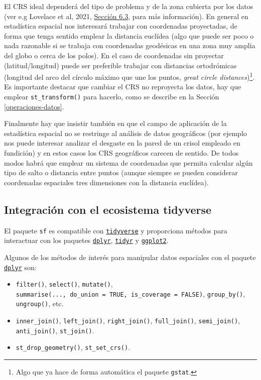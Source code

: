 \documentclass[
  spanish,
]{book}
\providecommand{\tightlist}{%
  \setlength{\itemsep}{0pt}\setlength{\parskip}{0pt}}
\theoremstyle{break}
\begin{document}
El CRS ideal dependerá del tipo de problema y de la zona cubierta por los datos (ver e.g Lovelace et al, 2021, \href{https://geocompr.robinlovelace.net/reproj-geo-data.html\#which-crs-to-use}{Sección 6.3}, para más información).
En general en estadística espacial nos interesará trabajar con coordenadas proyectadas, de forma que tenga sentido emplear la distancia euclídea (algo que puede ser poco o nada razonable si se trabaja con coordenadas geodésicas en una zona muy amplia del globo o cerca de los polos).
En el caso de coordenadas sin proyectar (latitud/longitud) puede ser preferible trabajar con distancias ortodrómicas (longitud del arco del círculo máximo que une los puntos, \emph{great circle distances})\footnote{Algo que ya hace de forma automática el paquete \texttt{gstat}.}.
Es importante destacar que cambiar el CRS no reproyecta los datos, hay que emplear \texttt{st\_transform()} para hacerlo, como se describe en la Sección \ref{operaciones-datos}.

Finalmente hay que insistir también en que el campo de aplicación de la estadística espacial no se restringe al análisis de datos geográficos (por ejemplo nos puede interesar analizar el desgaste en la pared de un crisol empleado en fundición) y en estos casos los CRS geográficos carecen de sentido.
De todos modos habrá que emplear un sistema de coordenadas que permita calcular algún tipo de salto o distancia entre puntos (aunque siempre se pueden considerar coordenadas espaciales tres dimensiones con la distancia euclídea).

\hypertarget{tidyverse-sf}{%
\subsection{\texorpdfstring{Integración con el ecosistema \textbf{tidyverse}}{Integración con el ecosistema tidyverse}}\label{tidyverse-sf}}

El paquete \texttt{sf} es compatible con \href{http://tidyverse.org}{\texttt{tidyverse}} y proporciona métodos para interactuar con los paquetes \href{https://dplyr.tidyverse.org}{\texttt{dplyr}},
\href{http://tidyr.tidyverse.org}{\texttt{tidyr}} y \href{https://ggplot2.tidyverse.org}{\texttt{ggplot2}}.

Algunos de los métodos de interés para manipular datos espaciales con el paquete \href{https://dplyr.tidyverse.org}{\texttt{dplyr}} son:

\begin{itemize}
\tightlist
\item
  \texttt{filter()}, \texttt{select()}, \texttt{mutate()}, \texttt{summarise(...,\ do\_union\ =\ TRUE,\ is\_coverage\ =\ FALSE)}, \texttt{group\_by()}, \texttt{ungroup()}, etc.
\item
  \texttt{inner\_join()}, \texttt{left\_join()}, \texttt{right\_join()}, \texttt{full\_join()}, \texttt{semi\_join()}, \texttt{anti\_join()}, \texttt{st\_join()}.
\item
  \texttt{st\_drop\_geometry()}, \texttt{st\_set\_crs()}.
\end{itemize}
\end{document}
